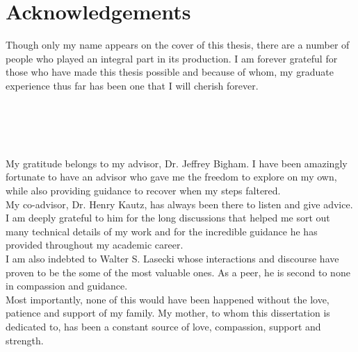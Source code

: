 \newpage                                             \chapter{Acknowledgements}

Though only my name appears on the cover of this thesis, there are a number of
people who played an integral part in its production. I am forever grateful for
those  who have made this thesis possible and because of whom, my graduate
experience thus far has been one that I will cherish forever.\\\\\\\\\


My gratitude belongs to my advisor, Dr. Jeffrey Bigham. I have been amazingly
fortunate to have an advisor who gave me the freedom to explore on my own, while
also providing guidance to recover when my steps faltered.\\


My co-advisor, Dr. Henry Kautz, has always been there to listen and give advice.
I am deeply grateful to him for the long discussions that helped me sort out
many technical details of my work and for the incredible guidance he has
provided throughout my academic career.\\

I am also indebted to Walter S. Lasecki whose interactions and discourse have
proven to be the some of the most valuable ones.  As a peer, he is second to
none in compassion and guidance.\\

Most importantly, none of this would have been happened without the love,
patience and support of my family. My mother, to whom this dissertation is
dedicated to, has been a constant source of love, compassion, support and
strength.